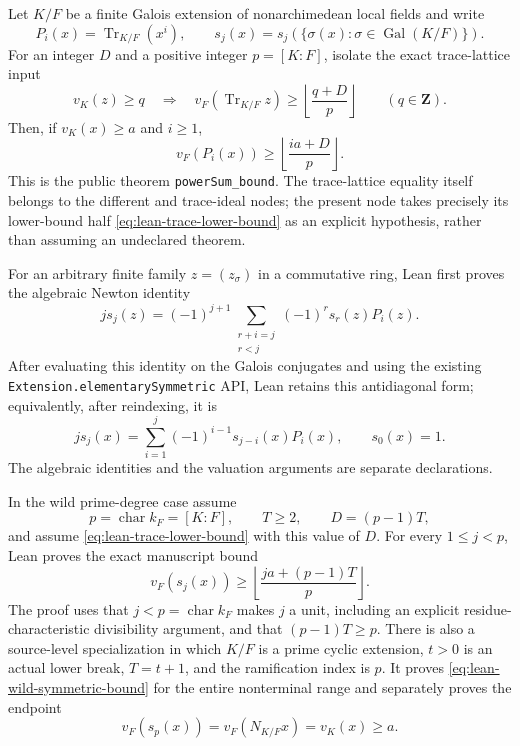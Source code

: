\begin{theorem}\label{mod:ramification-symmetricbounds}
Let $K/F$ be a finite Galois extension of nonarchimedean local fields and
write
\[
 P_i(x)=\operatorname{Tr}_{K/F}(x^i),\qquad
 s_j(x)=s_j(\{\sigma(x):\sigma\in\operatorname{Gal}(K/F)\}).
\]
For an integer $D$ and a positive integer $p=[K:F]$, isolate the exact
trace-lattice input
\begin{equation}\label{eq:lean-trace-lower-bound}
 v_K(z)\ge q
 \quad\Longrightarrow\quad
 v_F(\operatorname{Tr}_{K/F}z)
 \ge \left\lfloor\frac{q+D}{p}\right\rfloor
 \qquad(q\in\mathbf Z).
\end{equation}
Then, if $v_K(x)\ge a$ and $i\ge1$,
\begin{equation}\label{eq:lean-power-sum-bound}
 v_F(P_i(x))\ge\left\lfloor\frac{ia+D}{p}\right\rfloor.
\end{equation}
This is the public theorem \texttt{powerSum\_bound}.  The trace-lattice
equality itself belongs to the different and trace-ideal nodes; the present
node takes precisely its lower-bound half
\eqref{eq:lean-trace-lower-bound} as an explicit hypothesis, rather than
assuming an undeclared theorem.

For an arbitrary finite family $z=(z_\sigma)$ in a commutative ring, Lean
first proves the algebraic Newton identity
\[
 j s_j(z)=(-1)^{j+1}
 \sum_{\substack{r+i=j\\r<j}}(-1)^r s_r(z)P_i(z).
\]
After evaluating this identity on the Galois conjugates and using the
existing \texttt{Extension.elementarySymmetric} API, Lean retains this
antidiagonal form; equivalently, after reindexing, it is
\begin{equation}\label{eq:lean-newton-symmetric}
 j s_j(x)=\sum_{i=1}^{j}(-1)^{i-1}s_{j-i}(x)P_i(x),
 \qquad s_0(x)=1.
\end{equation}
The algebraic identities and the valuation arguments are separate
declarations.

In the wild prime-degree case assume
\[
 p=\operatorname{char}k_F=[K:F],\qquad
 T\ge2,\qquad D=(p-1)T,
\]
and assume \eqref{eq:lean-trace-lower-bound} with this value of $D$.
For every $1\le j<p$, Lean proves the exact manuscript bound
\begin{equation}\label{eq:lean-wild-symmetric-bound}
 v_F(s_j(x))\ge
 \left\lfloor\frac{ja+(p-1)T}{p}\right\rfloor.
\end{equation}
The proof uses that $j<p=\operatorname{char}k_F$ makes $j$ a unit, including
an explicit residue-characteristic divisibility argument, and that
$(p-1)T\ge p$.  There is also a source-level specialization in which
$K/F$ is a prime cyclic extension, $t>0$ is an actual lower break,
$T=t+1$, and the ramification index is $p$.  It proves
\eqref{eq:lean-wild-symmetric-bound} for the entire nonterminal range and
separately proves the endpoint
\begin{equation}\label{eq:lean-symmetric-endpoint}
 v_F(s_p(x))=v_F(N_{K/F}x)=v_K(x)\ge a.
\end{equation}


\end{theorem}
